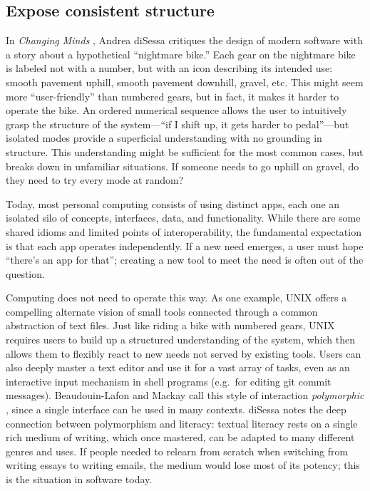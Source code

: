 \documentclass[english,submission]{programming}
\begin{document}
\hypertarget{expose-consistent-structure}{%
\subsection{Expose consistent
structure}\label{expose-consistent-structure}}

In \emph{Changing Minds} \autocite{disessa2000}, Andrea diSessa
critiques the design of modern software with a story about a
hypothetical ``nightmare bike.'' Each gear on the nightmare bike is
labeled not with a number, but with an icon describing its intended use:
smooth pavement uphill, smooth pavement downhill, gravel, etc. This
might seem more ``user-friendly'' than numbered gears, but in fact, it
makes it harder to operate the bike. An ordered numerical sequence
allows the user to intuitively grasp the structure of the system---``if
I shift up, it gets harder to pedal''---but isolated modes provide a
superficial understanding with no grounding in structure. This
understanding might be sufficient for the most common cases, but breaks
down in unfamiliar situations. If someone needs to go uphill on gravel,
do they need to try every mode at random?

Today, most personal computing consists of using distinct apps, each one
an isolated silo of concepts, interfaces, data, and functionality. While
there are some shared idioms and limited points of interoperability, the
fundamental expectation is that each app operates independently. If a
new need emerges, a user must hope ``there's an app for that''; creating
a new tool to meet the need is often out of the question.

Computing does not need to operate this way. As one example, UNIX offers
a compelling alternate vision of small tools connected through a common
abstraction of text files. Just like riding a bike with numbered gears,
UNIX requires users to build up a structured understanding of the
system, which then allows them to flexibly react to new needs not served
by existing tools. Users can also deeply master a text editor and use it
for a vast array of tasks, even as an interactive input mechanism in
shell programs (e.g.~for editing git commit messages). Beaudouin-Lafon
and Mackay call this style of interaction \emph{polymorphic}
\autocite{beaudouin-lafon2000}, since a single interface can be used in
many contexts. diSessa \autocite{disessa2000} notes the deep connection
between polymorphism and literacy: textual literacy rests on a single
rich medium of writing, which once mastered, can be adapted to many
different genres and uses. If people needed to relearn from scratch when
switching from writing essays to writing emails, the medium would lose
most of its potency; this is the situation in software today.
\end{document}
